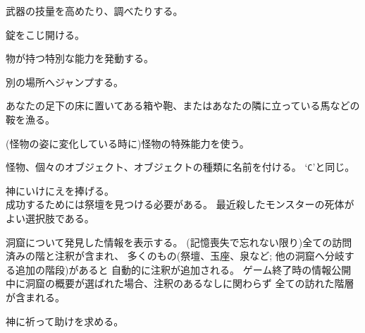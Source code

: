 武器の技量を高めたり、調べたりする。
\item[\tb{\#force}]
錠をこじ開ける。
\item[\tb{\#invoke}]
物が持つ特別な能力を発動する。
\item[\tb{\#jump}]
別の場所へジャンプする。
\item[\tb{\#loot}]
あなたの足下の床に置いてある箱や鞄、またはあなたの隣に立っている馬などの
鞍を漁る。
\item[\tb{\#monster}]
(怪物の姿に変化している時に)怪物の特殊能力を使う。
\item[\tb{\#name}]
怪物、個々のオブジェクト、オブジェクトの種類に名前を付ける。
`{\tt C}'と同じ。
\item[\tb{\#offer}]
神にいけにえを捧げる。\\
成功するためには祭壇を見つける必要がある。
最近殺したモンスターの死体がよい選択肢である。
\item[\tb{\#overview}]
洞窟について発見した情報を表示する。
(記憶喪失で忘れない限り)全ての訪問済みの階と注釈が含まれ、
多くのもの(祭壇、玉座、泉など; 他の洞窟へ分岐する追加の階段)があると
自動的に注釈が追加される。
ゲーム終了時の情報公開中に洞窟の概要が選ばれた場合、注釈のあるなしに関わらず
全ての訪れた階層が含まれる。
\item[\tb{\#pray}]
神に祈って助けを求める。\\
